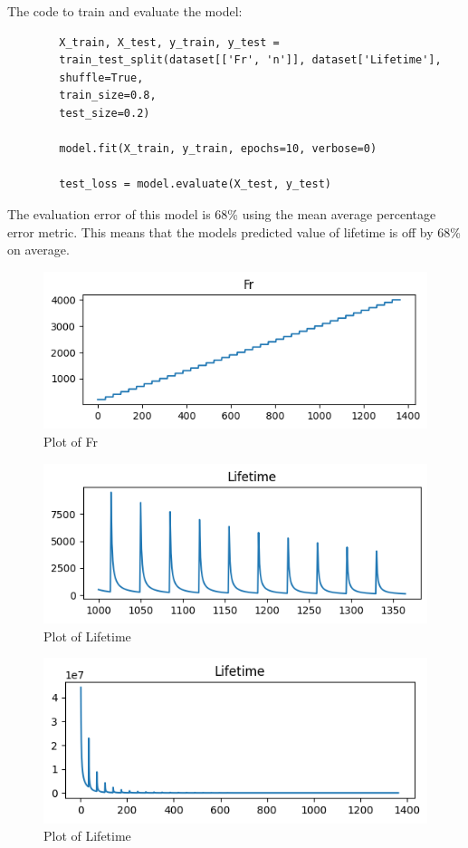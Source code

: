 \documentclass[letterpaper,10pt]{article}
\begin{document}
	\newpage
	The code to train and evaluate the model:
	\begin{lstlisting}
		X_train, X_test, y_train, y_test = 
		train_test_split(dataset[['Fr', 'n']], dataset['Lifetime'], 
		shuffle=True, 
		train_size=0.8, 
		test_size=0.2)
		
		model.fit(X_train, y_train, epochs=10, verbose=0)
		
		test_loss = model.evaluate(X_test, y_test)
	\end{lstlisting} 
	The evaluation error of this model is 68\% using the mean average percentage error metric. This means that the models predicted value of lifetime is off by 68\% on average.
	
	\begin{figure}
		\caption{Plot of Fr}
		\centering
		\includegraphics[scale=0.65]{assets/dataset1_column_Fr_plot.png}
	\end{figure}
	\begin{figure}
		\caption{Plot of Lifetime}
		\centering
		\includegraphics[scale=0.65]{assets/dataset1_column_Lifetime_plot2.png}
	\end{figure}
	\begin{figure}
		\caption{Plot of Lifetime}
		\centering
		\includegraphics[scale=0.65]{assets/dataset1_column_Lifetime_plot1.png}
	\end{figure}
\end{document}
